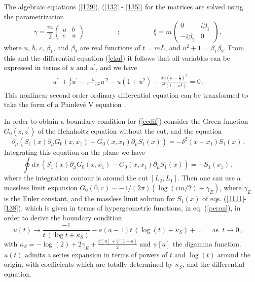 \documentclass[a4paper]{article}
\begin{document}
The algebraic equations (\ref{129}), (\ref{132} - \ref{135}) for the matrices are solved using the
parametrization
\begin{equation}
\gamma =\frac{m}{2}\left(
\begin{array}{ll}
u & b \\
c & u
\end{array}
\right)
\hspace{2cm};\hspace{2cm}\xi
=m\left(
\begin{array}{ll}
0 & i\beta _{1} \\
-i\beta _{2} & 0
\end{array}
\right)\,,
\end{equation}
where $u$, $b$, $c$, $\beta _{1}$, and $\beta _{2}$ are real functions of $t=mL$, and
$
u^{2}+1=\beta _{1}\beta _{2}$. 
From this and the differential equation (\ref{eku}) it follows that all variables can be expressed in terms of $u$ and $u^\prime$, and we have
\begin{eqnarray}
u^{\prime \prime } + \frac{1}{t}u^{\prime}-\frac{u}{1+u^{2}}
u^{\prime 2}-u(1+u^{2})-\frac{4u\left( a -\frac{1}{2}\right) ^{2}}{
t^{2}(1+u^{2})}=0 \label{ecdif}\,.
\end{eqnarray}
This nonlinear second order ordinary differential equation can be transformed to take 
 the form of a 
 Painlev\'e V equation \cite{fermion,ince}. 

In order to obtain a boundary condition for (\ref{ecdif}) consider the Green function $G_0(z,z^\prime)$ of the Helmholtz equation without the cut, and the equation
\begin{equation}
\partial_\mu \left(S_1(x)\partial_\mu G_0(x,x_1)-G_0(x,x_1)\partial_\mu S_1(x)\right)=-\delta^2(x-x_1) S_1(x)\,.
\end{equation} 
Integrating this equation on the plane we have
\begin{equation}
\oint dx\, \left(S_1(x)\partial_\mu G_0(x,x_1)-G_0(x,x_1)\partial_\mu S_1(x)\right)=-S_1(x_1)\,,\label{peron}
\end{equation}
 where the integration contour is around the cut $[L_2,L_1]$. Then one can use a massless limit expansion $G_0(0,r)\sim -1/(2\pi)(\log(r m/2)+\gamma_E)$, where $\gamma_E$ is the Euler constant, and the massless limit solution for $S_1(x)$ of eqs. (\ref{1111}-\ref{138}), which is given in terms of hypergeometric functions, in eq. (\ref{peron}), in order to derive the boundary condition 
\begin{equation}
u(t) \rightarrow  \frac{-1}{t \,(\log t+\kappa_S)}-a(a-1)t\,( \log(t)+\kappa_S)+...\;\;\;\;\;\textrm{as}\;\;t\to 0\,,\label{bbb1}
\end{equation}
with $\kappa_S=-\log(2)+2\gamma_E+\frac{\psi[a]+\psi[1-a]}{2}$ and $\psi[a]$ the digamma function. $u(t)$ admits a series expansion in terms of powers of $t$ and $\log(t)$ around the origin, with coefficients which are totally determined by $\kappa_S$, and the differential equation.
\end{document}
